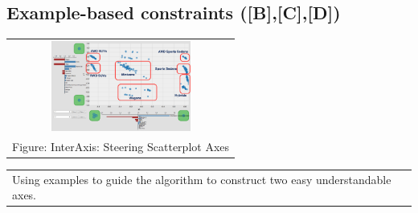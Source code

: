 \documentclass[portrait,final,a0paper]{nadiposter}
\begin{document}
\begin{poster}
{\begin{multicols}{3}
    \section*{\small{Example-based constraints (\small{[B],[C],[D]})}}
    \begin{center}
        \begin{tabular}{c}
            \includegraphics[height=8em]{poster_NADI_2018/images/eg_interaxis.png}\\
            \tiny{Figure: InterAxis: Steering Scatterplot Axes \cite{Kim2016InterAxis}}
        \end{tabular}
        \begin{tabular}{p{13em}}
            \quad Using examples to guide the algorithm to construct two easy understandable axes.
        \end{tabular}
    \end{center}
\end{multicols}
}

\end{poster}
\end{document}
